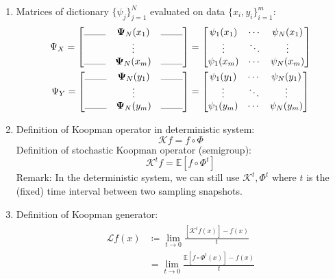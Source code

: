 \documentclass{article}[11]
\begin{document}
\begin{enumerate}
		\item Matrices of dictionary $\{\psi_j\}_{j=1}^N$ evaluated on data $\{x_i, y_i\}_{i=1}^m$:
		\begin{gather*}
			\Psi_X = \begin{bmatrix}
				\rule{0.8cm}{0.1mm} & \mathbf{\Psi}_N(x_1) & \rule{0.8cm}{0.1mm} \\
				& \vdots &   \\
				\rule{0.8cm}{0.1mm} & \mathbf{\Psi}_N(x_m) & \rule{0.8cm}{0.1mm}
			\end{bmatrix}
			=\begin{bmatrix}
				\psi_1(x_1) & \cdots & \psi_{N}(x_1) \\
				\vdots & \ddots & \vdots \\
				\psi_1(x_m) & \cdots & \psi_{N}(x_m)
			\end{bmatrix} \\
			\Psi_Y = \begin{bmatrix}
				\rule{0.8cm}{0.1mm} & \mathbf{\Psi}_N(y_1) & \rule{0.8cm}{0.1mm} \\
				& \vdots &   \\
				\rule{0.8cm}{0.1mm} & \mathbf{\Psi}_N(y_m) & \rule{0.8cm}{0.1mm}
			\end{bmatrix}
			= \begin{bmatrix}
				\psi_1(y_1) & \cdots & \psi_{N}(y_1) \\
				\vdots & \ddots & \vdots \\
				\psi_1(y_m) & \cdots & \psi_{N}(y_m)
			\end{bmatrix}
		\end{gather*}
		
		\item Definition of Koopman operator in deterministic system:
		$$\mathcal{K}f = f\circ\Phi$$
		Definition of stochastic Koopman operator (semigroup):
		$$\mathcal{K}^{t}f = \mathbb{E}[f\circ\Phi^{t}]$$
		Remark: In the deterministic system, we can still use $\mathcal{K}^t,\Phi^t$ where $t$ is the (fixed) time interval between two sampling snapshots.
		\item Definition of Koopman generator:
		\begin{gather}\label{def_generator}
			\begin{aligned}
				\mathcal{L}f(x) &\coloneqq \lim_{t \to 0} \frac{[\mathcal{K}^{t}f(x)] - f(x)}{t} \\
				&= \lim_{t \to 0} \frac{\mathbb{E}[f\circ\Phi^{t}(x)] - f(x)}{t}
			\end{aligned}
		\end{gather}
		
	\end{enumerate}
	
\end{document}
